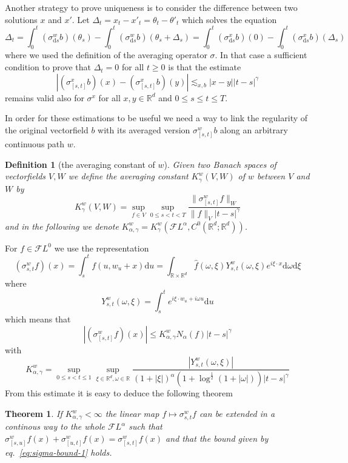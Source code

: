 \documentclass[11pt,a4paper,draft,reqno]{amsart}
\newtheorem{definition}{Definition}
\newtheorem{theorem}{Theorem}
\theoremstyle{definition}
\newcommand{\RR}{\mathbb{R}}
\newcommand{\cF}{\mathcal{F}}
\newcommand{\dd}{\mathrm{d}}
\begin{document}
Another strategy to prove uniqueness is to consider the difference between two solutions $x$ and $x'$. Let $\Delta_t = x_t -x'_t=\theta_t-\theta'_t$ which solves the equation
\begin{equation*}
\Delta_t = \int_0^t (\sigma^w_{\dd s}b)(\theta_s)-\int_0^t (\sigma^w_{\dd s}b)(\theta_s+\Delta_s) =
\int_0^t (\sigma^x_{\dd s}b)(0)-\int_0^t (\sigma^x_{\dd s}b)(\Delta_s)
\end{equation*}
where we used the definition of the averaging operator $\sigma$. In that case a sufficient condition to prove that $\Delta_t =0$ for all $t\ge 0$ is that the  estimate
$$
|(\sigma^x_{[s,t]}b)(x)-(\sigma^x_{[s,t]}b)(y)| \lesssim_{x,b} |x-y| |t-s|^\gamma
$$ 
remains valid also for $\sigma^x$ for all $x,y\in\RR^d$ and $0\le s \le t \le T$. 
 
 
In order for these estimations to be useful we need a way to link the regularity of the original vectorfield $b$ with its averaged version $\sigma^w_{[s,t]}b$ along an arbitrary continuous path $w$.

\begin{definition} [the averaging constant of $w$]
Given two Banach spaces of vectorfields $V,W$ we define the averaging constant $K^w_\gamma(V,W)$ of $w$ between $V$ and $W$ by
$$
K^w_\gamma(V,W) = \sup_{f\in V} \sup_{0\le s < t < T} \frac{\|\sigma^w_{[s,t]}f\|_W}{\|f\|_V|t-s|^\gamma}
$$
and in the following we denote $K^w_{\alpha,\gamma}=K^w_\gamma(\cF L^\alpha,C^0(\RR^d;\RR^d))$.
\end{definition}

 For $f\in\cF L^{0}$ we use the representation
\begin{equation}
\label{eq:fourier-representation}
(\sigma^w_{s,t} f)(x) =\int_s^t f(u,w_u+x)\dd u = \int_{\RR\times\RR^d} \hat f(\omega,\xi) Y_{s,t}^w(\omega,\xi) e^{i\xi\cdot x}\dd \omega \dd \xi 
\end{equation}
where
$$
Y_{s,t}^w(\omega,\xi) = \int_s^t e^{i\xi \cdot w_u+i\omega u} \dd u
$$
which means that 
\begin{equation}
\label{eq:sigma-bound-1}
|(\sigma^w_{[s,t]} f)(x)| \le K^w_{\alpha,\gamma} N_{\alpha}(f) |t-s|^\gamma 
\end{equation}
with
$$
K^w_{\alpha,\gamma}= \sup_{0\le s < t \le 1} \sup_{\xi\in\RR^d,\omega\in \RR} \frac{|Y_{s,t}^w(\omega,\xi)|}{(1+|\xi|)^{\alpha}\left(1+\log^{\frac12}(1+|\omega|)\right)|t-s|^\gamma}
$$
From this estimate it is easy to deduce the following theorem
\begin{theorem}
If $K^w_{\alpha,\gamma} < \infty$ the linear map $f \mapsto \sigma^w_{s,t}f$ can be extended in a continous way to the whole $\cF L^{\alpha}$ such that $\sigma^w_{[s,u]}f(x) + \sigma^w_{[u,t]}f(x) = \sigma^w_{[s,t]}f (x)$ and that the bound given by eq.~\eqref{eq:sigma-bound-1}  holds. 
\end{theorem}
\end{document}

